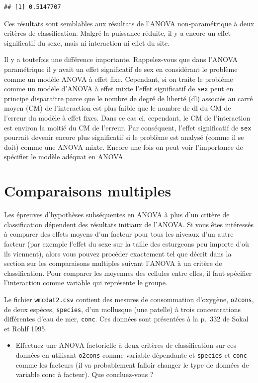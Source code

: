 \documentclass[
  12pt,
]{book}
\providecommand{\tightlist}{%
  \setlength{\itemsep}{0pt}\setlength{\parskip}{0pt}}
\begin{document}
\begin{verbatim}
## [1] 0.5147707
\end{verbatim}

Ces résultats sont semblables aux résultats de l'ANOVA non-paramétrique à deux critères de classification. Malgré la puissance réduite, il y a encore un effet significatif du sexe, mais ni interaction ni effet du site.

Il y a toutefois une différence importante. Rappelez-vous que dans l'ANOVA paramétrique il y avait un effet significatif de sex en considérant le problème comme un modèle ANOVA à effet fixe. Cependant, si on traite le problème comme un modèle d'ANOVA à effet mixte l'effet significatif de \texttt{sex} peut en principe disparaître parce que le nombre de degré de liberté (dl) associés au carré moyen (CM) de l'interaction est plus faible que le nombre de dl du CM de l'erreur du modèle à effet fixes. Dans ce cas ci, cependant, le CM de l'interaction est environ la moitié du CM de l'erreur. Par conséquent, l'effet significatif de \texttt{sex} pourrait devenir encore plus significatif si le problème est analysé (comme il se doit) comme une ANOVA mixte. Encore une fois on peut voir l'importance de spécifier le modèle adéquat en ANOVA.

\hypertarget{comparaisons-multiples}{%
\section{Comparaisons multiples}\label{comparaisons-multiples}}

Les épreuves d'hypothèses subséquentes en ANOVA à plus d'un critère de classification dépendent des résultats initiaux de l'ANOVA. Si vous êtes intéressés à comparer des effets moyens d'un facteur pour tous les niveaux d'un autre facteur (par exemple l'effet du sexe sur la taille des esturgeons peu importe d'où ils viennent), alors vous pouvez procéder exactement tel que décrit dans la section sur les comparaisons multiples suivant l'ANOVA à un critère de classification. Pour comparer les moyennes des cellules entre elles, il faut spécifier l'interaction comme variable qui représente le groupe.

Le fichier \texttt{wmcdat2.csv} contient des mesures de consommation d'oxygène, \texttt{o2cons}, de deux espèces, \texttt{species}, d'un mollusque (une patelle) à trois concentrations différentes d'eau de mer, \texttt{conc}. Ces données sont présentées à la p.~332 de Sokal et Rohlf 1995.

\begin{itemize}
\tightlist
\item
  Effectuez une ANOVA factorielle à deux critères de classification sur ces données en utilisant \texttt{o2cons} comme variable dépendante et \texttt{species} et \texttt{conc} comme les facteurs (il va probablement falloir changer le type de données de variable conc à facteur). Que concluez-vous ?
\end{itemize}
\end{document}
